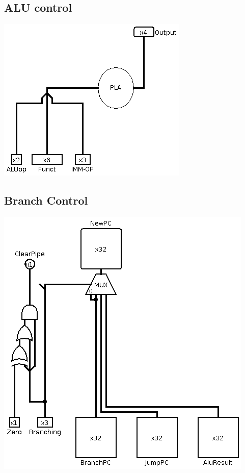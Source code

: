\subsection{ALU control}
\includegraphics[width=\textwidth]{billeder/ALU_control.png}

\subsection{Branch Control}
\includegraphics[width=\textwidth]{billeder/Branch_Control.png}

